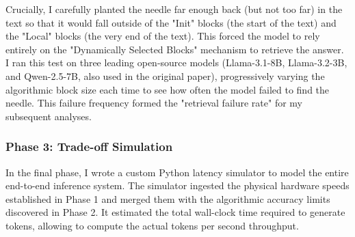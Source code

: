 \documentclass[conference]{IEEEtran}
\begin{document}
            Crucially, I carefully planted the needle far enough back (but not too far) in the text so that it would fall outside of the "Init" blocks (the start of the text) and the "Local" blocks (the very end of the text). This forced the model to rely entirely on the "Dynamically Selected Blocks" mechanism to retrieve the answer. I ran this test on three leading open-source models (Llama-3.1-8B, Llama-3.2-3B, and Qwen-2.5-7B, also used in the original paper), progressively varying the algorithmic block size each time to see how often the model failed to find the needle. This failure frequency formed the "retrieval failure rate" for my subsequent analyses.

        \subsubsection*{\textbf{Phase 3: Trade-off Simulation}}
            In the final phase, I wrote a custom Python latency simulator to model the entire end-to-end inference system. The simulator ingested the physical hardware speeds established in Phase 1 and merged them with the algorithmic accuracy limits discovered in Phase 2. It estimated the total wall-clock time required to generate tokens, allowing to compute the actual tokens per second throughput.
\end{document}
